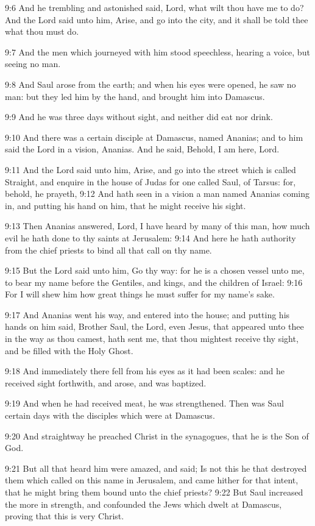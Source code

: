 9:6 And he trembling and astonished said, Lord, what wilt thou have me to do? And the Lord said unto him, Arise, and go into the city, and it shall be told thee what thou must do.

9:7 And the men which journeyed with him stood speechless, hearing a voice, but seeing no man.

9:8 And Saul arose from the earth; and when his eyes were opened, he saw no man: but they led him by the hand, and brought him into Damascus.

9:9 And he was three days without sight, and neither did eat nor drink.

9:10 And there was a certain disciple at Damascus, named Ananias; and to him said the Lord in a vision, Ananias. And he said, Behold, I am here, Lord.

9:11 And the Lord said unto him, Arise, and go into the street which is called Straight, and enquire in the house of Judas for one called Saul, of Tarsus: for, behold, he prayeth, 9:12 And hath seen in a vision a man named Ananias coming in, and putting his hand on him, that he might receive his sight.

9:13 Then Ananias answered, Lord, I have heard by many of this man, how much evil he hath done to thy saints at Jerusalem: 9:14 And here he hath authority from the chief priests to bind all that call on thy name.

9:15 But the Lord said unto him, Go thy way: for he is a chosen vessel unto me, to bear my name before the Gentiles, and kings, and the children of Israel: 9:16 For I will shew him how great things he must suffer for my name's sake.

9:17 And Ananias went his way, and entered into the house; and putting his hands on him said, Brother Saul, the Lord, even Jesus, that appeared unto thee in the way as thou camest, hath sent me, that thou mightest receive thy sight, and be filled with the Holy Ghost.

9:18 And immediately there fell from his eyes as it had been scales: and he received sight forthwith, and arose, and was baptized.

9:19 And when he had received meat, he was strengthened. Then was Saul certain days with the disciples which were at Damascus.

9:20 And straightway he preached Christ in the synagogues, that he is the Son of God.

9:21 But all that heard him were amazed, and said; Is not this he that destroyed them which called on this name in Jerusalem, and came hither for that intent, that he might bring them bound unto the chief priests?  9:22 But Saul increased the more in strength, and confounded the Jews which dwelt at Damascus, proving that this is very Christ.

